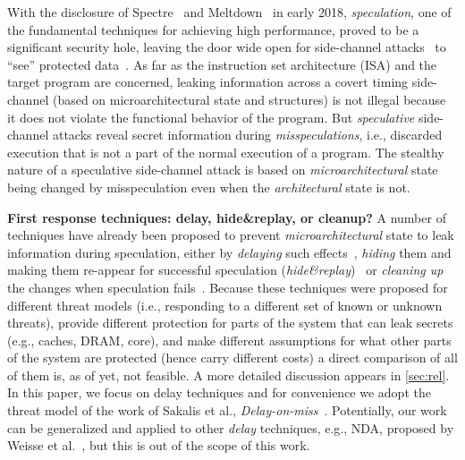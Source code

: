 With the disclosure of Spectre~\cite{kocher_spectre_2018} and Meltdown~\cite{lipp_meltdown_2018} in early 2018, \emph{speculation}, one of the fundamental techniques for achieving high
performance, proved to be a significant security hole, leaving the door wide
open for side-channel attacks~\cite{bernstein2005cache,yarom_flush+_2014,liu15llc,irazoqui_cross_2016} to ``see'' protected data~\cite{kocher_spectre_2018,lipp_meltdown_2018}.
As far as the instruction set architecture (ISA) and the target program are
concerned, leaking information across a covert timing side-channel (based on microarchitectural state and structures) is not illegal
because it does not violate the functional behavior of the program.
But \emph{speculative} side-channel attacks reveal secret information during \emph{misspeculations}, 
i.e., discarded execution that is not a part of the normal execution of a program.
The stealthy nature of a speculative side-channel attack is based on
\emph{microarchitectural} state being changed by misspeculation even when the \emph{architectural}
state is not.

\noindent \textbf{First response techniques: delay, hide\&replay, or cleanup?}
A number of techniques have already been proposed to prevent \emph{microarchitectural} state to leak information during speculation, either by %
\emph{delaying} such effects~\cite{sakalis+:ISCA2019vp,weisse2019nda,yu_speculative:MICRO2019-STT}, %
\emph{hiding} them and making them re-appear for successful speculation (\emph{hide\&replay})~\cite{yan_invisispec:MICRO2018,sakalis+:CF2019ghost} or %
\emph{cleaning up} the changes when speculation fails~\cite{saileshwar2019cleanupspec}. %
Because these techniques were proposed for different threat models (i.e.,  responding to a different set of known or unknown threats), provide different protection for parts of the system that can leak secrets (e.g., caches, DRAM, core), and make different assumptions for what other parts of the system are protected (hence carry different costs) a direct comparison of all of them is, as of yet, not feasible.
A more detailed discussion appears in \autoref{sec:rel}. 
In this paper, we focus on delay techniques and for convenience we adopt the threat model of the work of Sakalis et al., \emph{Delay-on-miss}~\cite{sakalis+:CF2019ghost}. Potentially, our work can be generalized and applied to other \emph{delay} techniques, e.g., NDA, proposed by Weisse et al.~\cite{weisse2019nda}, but this is out of the scope of this work.

